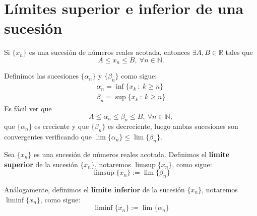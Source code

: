 
\section{Límites superior e inferior de una sucesión}

Si $\{x_n\}$ es una sucesión de números reales acotada, entonces $\exists A,B \in \mathbb{R}$ tales que
\begin{equation*}
    A \leq x_n \leq B, ~ \forall n \in \mathbb{N}.
\end{equation*}

Definimos las sucesiones $\{\alpha_n\}$ y $\{\beta_n\}$ como sigue:
\begin{gather*}
    \alpha_n = \inf \{x_k ~:~ k \geq n\} \\
    \beta_n = \sup \{x_k ~:~ k \geq n\}
\end{gather*}
Es fácil ver que
\begin{equation*}
    A \leq \alpha_n \leq \beta_n \leq B, ~\forall n \in \mathbb{N},
\end{equation*}
que $\{\alpha_n\}$ es creciente y que $\{\beta_n\}$ es decreciente, luego ambas sucesiones son convergentes verificando que $\lim \{\alpha_n\} \leq \lim \{\beta_n\}$.
\begin{definicion}
    Sea $\{x_n\}$ es una sucesión de números reales acotada. Definimos el \textbf{límite superior} de la sucesión $\{x_n\}$, notaremos $\limsup \{x_n\}$, como sigue:
    \begin{equation*}
        \limsup \{x_n\} := \lim \{\beta_n\}
    \end{equation*}
    
    Análogamente, definimos el \textbf{límite inferior}  de la sucesión $\{x_n\}$, notaremos $\liminf \{x_n\}$, como sigue:
    \begin{equation*}
        \liminf \{x_n\} := \lim \{\alpha_n\}
    \end{equation*}
\end{definicion}

